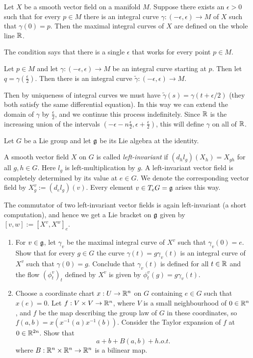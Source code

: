 \documentclass[11pt, english]{article}
\begin{document}
\begin{exc}
Let $X$ be a smooth vector field on a manifold $M$. Suppose there exists an $\epsilon > 0$ such that for every $p \in M$ there is an integral curve $\gamma:(-\epsilon, \epsilon) \to M$ of $X$ such that $\gamma(0)=p$. Then the maximal integral curves of $X$ are defined on the whole line $\mathbb{R}$.
\end{exc}

\begin{sol}
The condition says that there is a single $\epsilon$ that works for every point $p \in M$.

Let $p \in M$ and let $\gamma:(-\epsilon,\epsilon) \to M$ be an integral curve starting at $p$. Then let $q=\gamma(\frac \epsilon 2)$. Then there is an integral curve $\tilde \gamma:(-\epsilon, \epsilon) \to M$. 

Then by uniqueness of integral curves we must have $\tilde \gamma(s)=\gamma(t+\epsilon/2)$ (they both satisfy the same differential equation). In this way we can extend the domain of $\gamma$ by $\frac \epsilon 2$, and we continue this process indefinitely. Since $\mathbb{R}$ is the increasing union of the intervals $(-\epsilon-n \frac \epsilon 2, \epsilon + \frac \epsilon 2)$, this will define $\gamma$ on all of $\mathbb{R}$.
\end{sol}

\begin{exc}
Let $G$ be a Lie group and let $\mathfrak g$ be its Lie algebra at the identity.

A smooth vector field $X$ on $G$ is called \emph{left-invariant} if $(d_hl_g)(X_h)=X_{gh}$ for all $g,h \in G$. Here $l_g$ is left-multiplication by $g$. A left-invariant vector field is completely determined by its value at $e \in G$. We denote the corresponding vector field by $X^v_g := (d_el_g)(v)$. Every element $v \in T_e G=\mathfrak g$ arises this way. 

The commutator of two left-invariant vector fields is again left-invariant (a short computation), and hence we get a Lie bracket on $\mathfrak g$ given by $[v,w] := [X^v, X^w]_e$. 

\begin{enumerate}
\item For $v \in \mathfrak g$, let $\gamma_v$ be the maximal integral curve of $X^v$ such that $\gamma_v(0)=e$. Show that for every $g \in G$ the curve $\gamma(t)=g \gamma_v(t)$ is an integral curve of $X^v$ such that $\gamma(0)=g$. Conclude that $\gamma_v(t)$ is defined for all $t \in \mathbb{R}$ and the flow $(\phi_t^v)_t$ defined by $X^v$ is given by $\phi_t^v(g)=g\gamma_v(t)$. 

\item Choose a coordinate chart $x:U \to \mathbb{R}^n$ on $G$ containing $e \in G$ such that $x(e)=0$. Let $f:V \times V \to \mathbb{R}^n$, where $V$ is a small neighbourhood of $0 \in \mathbb{R}^n$, and $f$ be the map describing the group law of $G$ in these coordinates, so $f(a,b)=x(x^{-1}(a)x^{-1}(b))$. Consider the Taylor expansion of $f$ at $0 \in \mathbb{R}^{2n}$. Show that
$$
a+b+B(a,b)+h.o.t.
$$
where $B:\mathbb{R}^n \times \mathbb{R}^n \to \mathbb{R}^n$ is a bilinear map.
\end{enumerate}
\end{exc}
\end{document}
